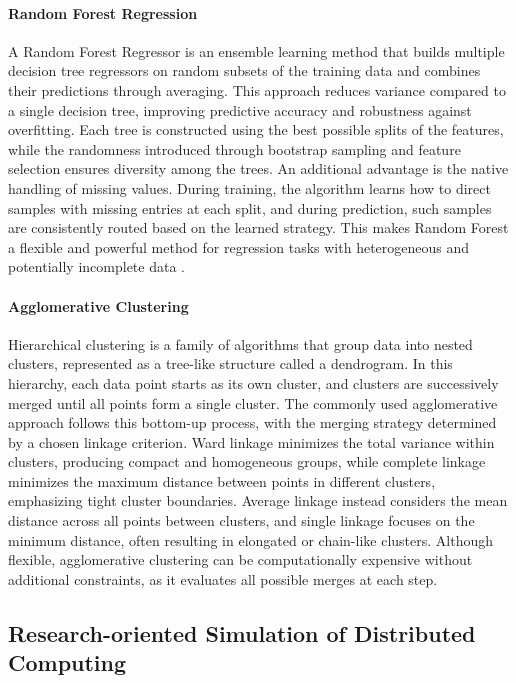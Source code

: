 \paragraph{Random Forest Regression}
\label{sec:background_ml_rfr}
A Random Forest Regressor is an ensemble learning method that builds multiple decision tree regressors on random subsets of the training data and combines their predictions through averaging. This approach reduces variance compared to a single decision tree, improving predictive accuracy and robustness against overfitting. Each tree is constructed using the best possible splits of the features, while the randomness introduced through bootstrap sampling and feature selection ensures diversity among the trees. An additional advantage is the native handling of missing values. During training, the algorithm learns how to direct samples with missing entries at each split, and during prediction, such samples are consistently routed based on the learned strategy. This makes Random Forest a flexible and powerful method for regression tasks with heterogeneous and potentially incomplete data \cite{Breiman2001RandomF}.

\paragraph{Agglomerative Clustering}
\label{sec:background_ml_ac}
Hierarchical clustering is a family of algorithms that group data into nested clusters, represented as a tree-like structure called a dendrogram. In this hierarchy, each data point starts as its own cluster, and clusters are successively merged until all points form a single cluster. The commonly used agglomerative approach follows this bottom-up process, with the merging strategy determined by a chosen linkage criterion. Ward linkage minimizes the total variance within clusters, producing compact and homogeneous groups, while complete linkage minimizes the maximum distance between points in different clusters, emphasizing tight cluster boundaries. Average linkage instead considers the mean distance across all points between clusters, and single linkage focuses on the minimum distance, often resulting in elongated or chain-like clusters. Although flexible, agglomerative clustering can be computationally expensive without additional constraints, as it evaluates all possible merges at each step.

\subsection{Research-oriented Simulation of Distributed Computing}
\label{sec:background_simulation}

